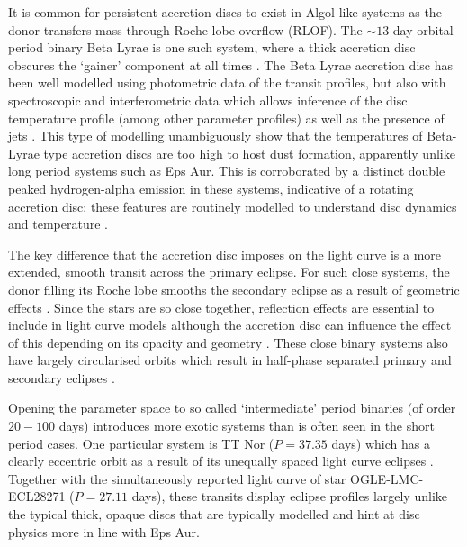 \documentclass[%
 reprint,
 amsmath,amssymb,
 aps,
rmp,
floatfix,
]{revtex4-2}
\begin{document}
It is common for persistent accretion discs to exist in Algol-like systems as the donor transfers mass through Roche lobe overflow (RLOF). The $\sim 13$ day orbital period binary Beta Lyrae is one such system, where a thick accretion disc obscures the `gainer' component at all times \citep[][for direct images]{Ak2007A&A, Zhao2008ApJ}. The Beta Lyrae accretion disc has been well modelled using photometric data of the transit profiles, but also with spectroscopic and interferometric data which allows inference of the disc temperature profile (among other parameter profiles) as well as the presence of jets \citep{Broz2021A&A}. This type of modelling \citep[together with the system V4142 Sgr, for example;][and references on other systems therein]{Rosales2023A&A} unambiguously show that the temperatures of Beta-Lyrae type accretion discs are too high to host dust formation, apparently unlike long period systems such as Eps Aur. This is corroborated by a distinct double peaked hydrogen-alpha emission in these systems, indicative of a rotating accretion disc; these features are routinely modelled to understand disc dynamics and temperature \citep[for examples modelling AU Mon]{Desmet2010MNRAS, Atwood-Stone2012ApJ}.

The key difference that the accretion disc imposes on the light curve is a more extended, smooth transit across the primary eclipse. For such close systems, the donor filling its Roche lobe smooths the secondary eclipse as a result of geometric effects \citep{Huang1963ApJ, Wilson2018ApJ}. Since the stars are so close together, reflection effects are essential to include in light curve models although the accretion disc can influence the effect of this depending on its opacity and geometry \citep{Wilson1990ApJ, Pavlovski2006A&A}. These close binary systems also have largely circularised orbits \citep[][mostly due to tidal effects]{Moe2017ApJS, Zasche2018A&A} which result in half-phase separated primary and secondary eclipses \citep[although there has been at least one discovery with a non-zero eccentricity of $e \simeq 0.021$ in][]{Miller2007ApJ}.

Opening the parameter space to so called `intermediate' period binaries (of order $20-100$ days) introduces more exotic systems than is often seen in the short period cases. One particular system is TT Nor ($P=37.35$ days) which has a clearly eccentric orbit as a result of its unequally spaced light curve eclipses \citep{Rowan2023MNRAS}. Together with the simultaneously reported light curve of star OGLE-LMC-ECL28271 ($P=27.11$ days), these transits display eclipse profiles largely unlike the typical thick, opaque discs that are typically modelled \citep{Rowan2023MNRAS} and hint at disc physics more in line with Eps Aur.  
\end{document}
